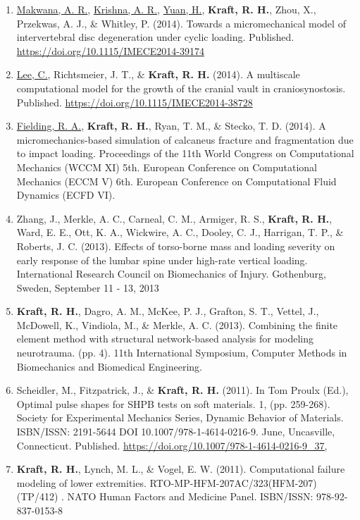 \documentclass[a4paper,10pt]{article}
\begin{document}
\begin{enumerate}
  \item \underline{Makwana, A. R.}, \underline{Krishna, A. R.}, \underline{Yuan, H.}, \textbf{\textbf{Kraft,} R. H.}, Zhou, X., Przekwas, A. J., \&
 Whitley, P. (2014). Towards a micromechanical model of intervertebral disc degeneration under cyclic loading. Published. \url{https://doi.org/10.1115/IMECE2014-39174}
  \item \underline{Lee, C.}, Richtsmeier, J. T., \&
 \textbf{\textbf{Kraft,} R. H.} (2014). A multiscale computational model for the growth of the cranial vault in craniosynostosis. Published. \url{https://doi.org/10.1115/IMECE2014-38728}
  \item \underline{Fielding, R. A.}, \textbf{\textbf{Kraft,} R. H.}, Ryan, T. M., \&
 Stecko, T. D. (2014). A micromechanics-based simulation of calcaneus fracture and fragmentation due to impact loading. Proceedings of the 11th World Congress on Computational Mechanics (WCCM XI) 5th. European Conference on Computational Mechanics (ECCM V)    6th. European Conference on Computational Fluid Dynamics (ECFD VI).
  \item Zhang, J., Merkle, A. C., Carneal, C. M., Armiger, R. S., \textbf{\textbf{Kraft,} R. H.}, Ward, E. E., Ott, K. A., Wickwire, A. C., Dooley, C. J., Harrigan, T. P., \&
 Roberts, J. C. (2013). Effects of torso-borne mass and loading severity on early response of the lumbar spine under high-rate vertical loading. International Research Council on Biomechanics of Injury.    
Gothenburg, Sweden, September 11 - 13,    2013
  \item \textbf{\textbf{Kraft,} R. H.}, Dagro, A. M., McKee, P. J., Grafton, S. T., Vettel, J., McDowell, K., Vindiola, M., \&
 Merkle, A. C. (2013). Combining the finite element method with structural network-based analysis for modeling neurotrauma. (pp. 4). 11th International Symposium, Computer Methods in Biomechanics and Biomedical Engineering.
  \item Scheidler, M., Fitzpatrick, J., \&
 \textbf{\textbf{Kraft,} R. H.} (2011). In Tom Proulx (Ed.), Optimal pulse shapes for SHPB tests on soft materials. 1, (pp. 259-268). Society for Experimental Mechanics Series, Dynamic Behavior of Materials.  ISBN/ISSN: 2191-5644 
DOI 10.1007/978-1-4614-0216-9. June, Uncasville, Connecticut. Published. \url{https://doi.org/10.1007/978-1-4614-0216-9_37,}
  \item \textbf{\textbf{Kraft,} R. H.}, Lynch, M. L., \&
 Vogel, E. W. (2011). Computational failure modeling of lower extremities. RTO-MP-HFM-207AC/323(HFM-207)(TP/412) . NATO Human Factors and Medicine Panel. ISBN/ISSN: 978-92-837-0153-8

\end{enumerate}
\end{document}
